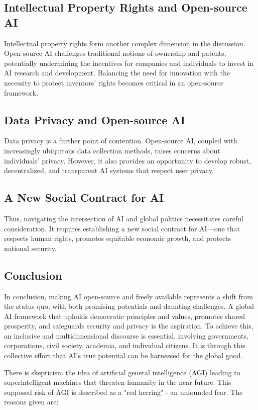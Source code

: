 \subsection{Intellectual Property Rights and Open-source AI}
Intellectual property rights form another complex dimension in the discussion. Open-source AI challenges traditional notions of ownership and patents, potentially undermining the incentives for companies and individuals to invest in AI research and development. Balancing the need for innovation with the necessity to protect inventors' rights becomes critical in an open-source framework.

\subsection{Data Privacy and Open-source AI}
Data privacy is a further point of contention. Open-source AI, coupled with increasingly ubiquitous data collection methods, raises concerns about individuals' privacy. However, it also provides an opportunity to develop robust, decentralized, and transparent AI systems that respect user privacy.

\subsection{A New Social Contract for AI}
Thus, navigating the intersection of AI and global politics necessitates careful consideration. It requires establishing a new social contract for AI—one that respects human rights, promotes equitable economic growth, and protects national security.

\subsection{Conclusion}
In conclusion, making AI open-source and freely available represents a shift from the status quo, with both promising potentials and daunting challenges. A global AI framework that upholds democratic principles and values, promotes shared prosperity, and safeguards security and privacy is the aspiration. To achieve this, an inclusive and multidimensional discourse is essential, involving governments, corporations, civil society, academia, and individual citizens. It is through this collective effort that AI's true potential can be harnessed for the global good.

There is skepticism the idea of artificial general intelligence (AGI) leading to superintelligent machines that threaten humanity in the near future. This supposed risk of AGI is described as a "red herring" - an unfounded fear. The reasons given are:

